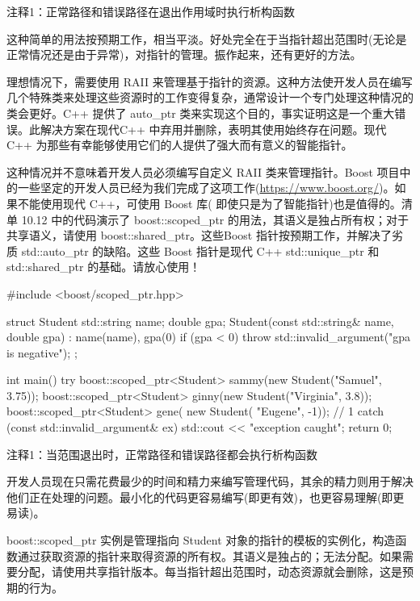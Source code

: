 {\footnotesize
注释1：正常路径和错误路径在退出作用域时执行析构函数
}

这种简单的用法按预期工作，相当平淡。好处完全在于当指针超出范围时(无论是正常情况还是由于异常)，对指针的管理。振作起来，还有更好的方法。


理想情况下，需要使用 RAII 来管理基于指针的资源。这种方法使开发人员在编写几个特殊类来处理这些资源时的工作变得复杂，通常设计一个专门处理这种情况的类会更好。C++ 提供了 auto\_ptr 类来实现这个目的，事实证明这是一个重大错误。此解决方案在现代C++ 中弃用并删除，表明其使用始终存在问题。现代 C++ 为那些有幸能够使用它们的人提供了强大而有意义的智能指针。

这种情况并不意味着开发人员必须编写自定义 RAII 类来管理指针。Boost 项目中的一些坚定的开发人员已经为我们完成了这项工作(\url{https://www.boost.org/})。如果不能使用现代 C++，可使用 Boost 库( 即使只是为了智能指针)也是值得的。清单 10.12 中的代码演示了 boost::scoped\_ptr 的用法，其语义是独占所有权；对于共享语义，请使用 boost::shared\_ptr。这些Boost 指针按预期工作，并解决了劣质 std::auto\_ptr 的缺陷。这些 Boost 指针是现代 C++ std::unique\_ptr 和 std::shared\_ptr 的基础。请放心使用！


\begin{cpp}
#include <boost/scoped_ptr.hpp>

struct Student {
  std::string name;
  double gpa;
  Student(const std::string& name, double gpa) : name(name), gpa(0) {
    if (gpa < 0)
      throw std::invalid_argument("gpa is negative");
  }
};

int main() {
  try {
    boost::scoped_ptr<Student> sammy(new Student("Samuel", 3.75));
    boost::scoped_ptr<Student> ginny(new Student("Virginia", 3.8));
    boost::scoped_ptr<Student> gene(
    new Student( "Eugene", -1)); // 1
  } catch (const std::invalid_argument& ex) {
    std::cout << "exception caught\n";
  }
  return 0;
}
\end{cpp}

{\footnotesize
注释1：当范围退出时，正常路径和错误路径都会执行析构函数
}

开发人员现在只需花费最少的时间和精力来编写管理代码，其余的精力则用于解决他们正在处理的问题。最小化的代码更容易编写(即更有效)，也更容易理解(即更易读)。

boost::scoped\_ptr 实例是管理指向 Student 对象的指针的模板的实例化，构造函数通过获取资源的指针来取得资源的所有权。其语义是独占的；无法分配。如果需要分配，请使用共享指针版本。每当指针超出范围时，动态资源就会删除，这是预期的行为。


